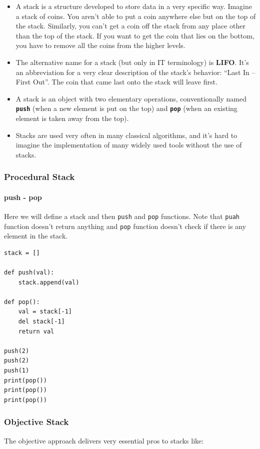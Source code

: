 \documentclass[11pt]{article}
\begin{document}
\begin{itemize}
\item A stack is a structure developed to store data in a very specific
way. Imagine a stack of coins. You aren’t able to put a coin
anywhere else but on the top of the stack. Similarly, you can’t get
a coin off the stack from any place other than the top of the
stack. If you want to get the coin that lies on the bottom, you have
to remove all the coins from the higher levels.
\item The alternative name for a stack (but only in IT terminology) is
\textbf{LIFO}. It’s an abbreviation for a very clear description of the
stack’s behavior: “Last In – First Out”. The coin that came last
onto the stack will leave first.
\item A stack is an object with two elementary operations, conventionally
named \textbf{\texttt{push}} (when a new element is put on the top) and \textbf{\texttt{pop}} (when an
existing element is taken away from the top).
\item Stacks are used very often in many classical algorithms, and it’s
hard to imagine the implementation of many widely used tools without
the use of stacks.
\end{itemize}

\subsubsection{Procedural Stack}
\label{sec:org92e3dbf}
\paragraph{push - pop}
\label{sec:org0c4b502}
Here we will define a stack and then \texttt{push} and \texttt{pop} functions. Note
that \texttt{puah} function doesn’t return anything and \texttt{pop} function
doesn’t check if there is any element in the stack.

\begin{verbatim}
stack = []

def push(val):
    stack.append(val)

def pop():
    val = stack[-1]
    del stack[-1]
    return val

push(2)
push(2)
push(1)
print(pop())
print(pop())
print(pop())
\end{verbatim}

\subsubsection{Objective Stack}
\label{sec:orgded49dd}
The objective approach delivers very essential pros to stacks like:
\end{document}
